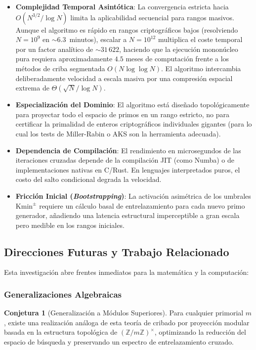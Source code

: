 \documentclass{article}
\numberwithin{equation}{section}
\theoremstyle{plain}
\theoremstyle{definition}
\newtheorem{conjecture}[theorem]{Conjetura}
\begin{document}
\begin{itemize}
    \item \textbf{Complejidad Temporal Asintótica}: La convergencia estricta hacia $O(N^{3/2}/\log N)$ limita la aplicabilidad secuencial para rangos masivos. Aunque el algoritmo es rápido en rangos criptográficos bajos (resolviendo $N=10^9$ en $\sim 6.3$~minutos), escalar a $N=10^{12}$ multiplica el coste temporal por un factor analítico de $\sim 31\,622$, haciendo que la ejecución mononúcleo pura requiera aproximadamente $4.5$ meses de computación frente a los métodos de criba segmentada $O(N \log \log N)$. El algoritmo intercambia deliberadamente velocidad a escala masiva por una compresión espacial extrema de $\Theta(\sqrt{N}/\log N)$.
    \item \textbf{Especialización del Dominio}: El algoritmo está diseñado topológicamente para proyectar todo el espacio de primos en un rango estricto, no para certificar la primalidad de enteros criptográficos individuales gigantes (para lo cual los tests de Miller-Rabin o AKS son la herramienta adecuada).
    \item \textbf{Dependencia de Compilación}: El rendimiento en microsegundos de las iteraciones cruzadas depende de la compilación JIT (como Numba) o de implementaciones nativas en C/Rust. En lenguajes interpretados puros, el costo del salto condicional degrada la velocidad.
    \item \textbf{Fricción Inicial (\textit{Bootstrapping})}: La activación asimétrica de los umbrales $\mathrm{Kmin}^\pm$ requiere un cálculo basal de entrelazamiento para cada nuevo primo generador, añadiendo una latencia estructural imperceptible a gran escala pero medible en los rangos iniciales.
\end{itemize}

\subsection{Direcciones Futuras y Trabajo Relacionado}

Esta investigación abre frentes inmediatos para la matemática y la computación:

\subsubsection{Generalizaciones Algebraicas}

\begin{conjecture}[Generalización a Módulos Superiores]
Para cualquier primorial $m$, existe una realización análoga de esta teoría de cribado por proyección modular basada en la estructura topológica de $(\mathbb{Z}/m\mathbb{Z})^\times$, optimizando la reducción del espacio de búsqueda y preservando un espectro de entrelazamiento cruzado.
\end{conjecture}
\end{document}
